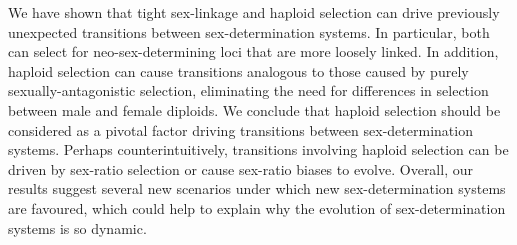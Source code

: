 \documentclass[12pt]{article}
\begin{document}
We have shown that tight sex-linkage and haploid selection can drive previously unexpected transitions between sex-determination systems.
In particular, both can select for neo-sex-determining loci that are more loosely linked. 
In addition, haploid selection can cause transitions analogous to those caused by purely sexually-antagonistic selection, eliminating the need for differences in selection between male and female diploids.
We conclude that haploid selection should be considered as a pivotal factor driving transitions between sex-determination systems. 
Perhaps counterintuitively, transitions involving haploid selection can be driven by sex-ratio selection or cause sex-ratio biases to evolve. 
Overall, our results suggest several new scenarios under which new sex-determination systems are favoured, which could help to explain why the evolution of sex-determination systems is so dynamic. 





\newpage
\end{document}
